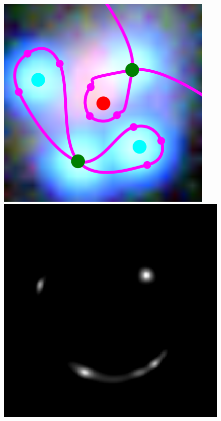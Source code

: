 \documentclass[usenatbib]{mn2e}
\newlength{\myplotswidth}
\begin{document}
\begin{figure}
  \centering
  \includegraphics[width=\myplotswidth]{fig/006915_input}
  \includegraphics[width=\myplotswidth]{fig/006915_arr_time_ipol} \\

\end{figure}
\end{document}
